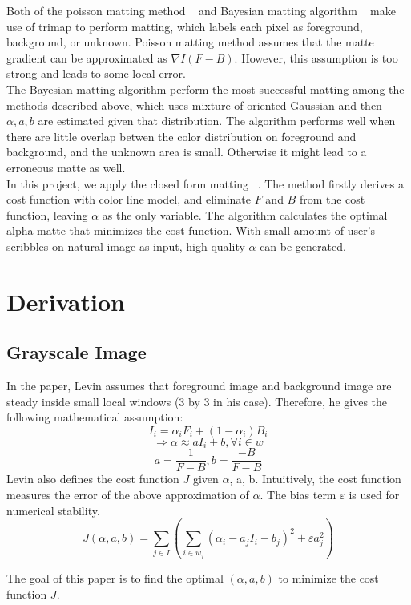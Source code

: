 \documentclass[11pt,letterpaper]{article}
\begin{document}
Both of the poisson matting method ~\cite{Sun:2004} and Bayesian matting algorithm ~\cite{Chuang:2001} make use of trimap to perform matting, which labels each pixel as foreground, background, or unknown. Poisson matting method assumes that the matte gradient can be approximated as $\nabla I (F - B)$. However, this assumption is too strong and leads to some local error. \\

The Bayesian matting algorithm perform the most successful matting among the methods described above, which uses mixture of oriented Gaussian and then $\alpha, a, b$ are estimated given that distribution. The algorithm performs well when there are little overlap betwen the color distribution on foreground and background, and the unknown area is small. Otherwise it might lead to a erroneous matte as well. \\

In this project, we apply the closed form matting ~\cite{Levin:2006}. The method firstly derives a cost function with color line model, and eliminate $F$ and $B$ from the cost function, leaving $\alpha$ as the only variable. The algorithm calculates the optimal alpha matte that minimizes the cost function. With small amount of user's scribbles on natural image as input, high quality $\alpha$ can be generated.

\section{Derivation}
\subsection{Grayscale Image}
In the paper, Levin assumes that foreground image and background image are steady inside small local windows (3 by 3 in his case). Therefore, he gives the following mathematical assumption:
$$I_i = \alpha_i F_i + (1 - \alpha_i)B_i$$
$$\Rightarrow \alpha \approx aI_{i} + b, \forall i \in w $$
$$a = \frac{1}{F-B}, b = \frac{-B}{F-B} $$
Levin also defines the cost function $J$ given $\alpha$, a, b. Intuitively, the cost function measures the error of the above approximation of $\alpha$. The bias term $\varepsilon$ is used for numerical stability.
$$J(\alpha, a, b) = \sum_{j \in I}(\sum_{i \in w_j}(\alpha_i - a_jI_i-b_j)^2+\varepsilon a_j^2)$$

The goal of this paper is to find the optimal $(\alpha, a, b)$ to minimize the cost function $J$.\\
\end{document}
